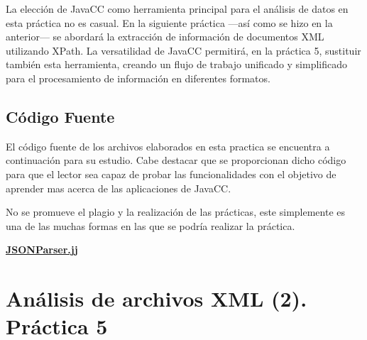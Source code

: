 La elección de JavaCC como herramienta principal para el análisis de datos en esta práctica no es casual. En la siguiente práctica ---así como se hizo en la anterior--- se abordará la extracción de información de documentos XML utilizando XPath. La versatilidad de JavaCC permitirá, en la práctica 5, sustituir también esta herramienta, creando un flujo de trabajo unificado y simplificado para el procesamiento de información en diferentes formatos.



\subsection{Código Fuente}

\noindent El código fuente de los archivos elaborados en esta practica se encuentra a continuación para su estudio. Cabe destacar que se proporcionan dicho código para que el lector sea capaz de probar las funcionalidades con el objetivo de aprender mas acerca de las aplicaciones de JavaCC.

No se promueve el plagio y la realización de las prácticas, este simplemente es una de las muchas formas en las que se podría realizar la práctica.

\hyperref[sec:JSONParser]{\textbf{JSONParser.jj}}

\section{Análisis de archivos XML (2). Práctica 5}


